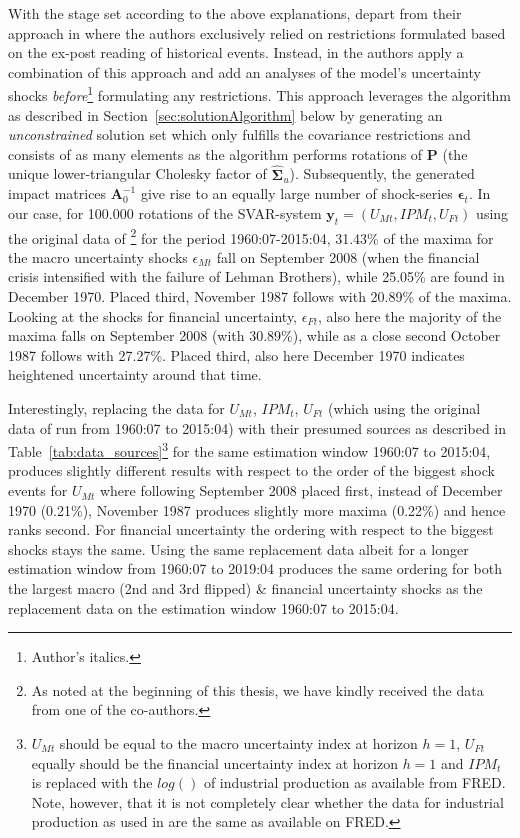 \documentclass[a4paper,11pt,listof=nochaptergap,oneside,pointednumbers,bibtotoc,bigheadings,liststotoc,hidelinks]{scrbook}
\theoremstyle{mysatz}
\theoremstyle{mydefinition}
\theoremstyle{mytheorem}
\theoremstyle{mybemerkung}
\let\oldhat\hat
\newcommand{\vect}[1]{\boldsymbol{\mathbf{#1}}}
\newcommand{\hatt}[1]{\oldhat{\boldsymbol{\mathbf{#1}}}}
\begin{document}
With the stage set according to the above explanations, \citet{ludvigsonetal:19} depart from their approach in \citet{ludvigsonetal:18} where the authors exclusively relied on restrictions formulated based on the ex-post reading of historical events. Instead, in \citet{ludvigsonetal:19} the authors apply a combination of this approach and add an analyses of the model's uncertainty shocks \textit{before}\footnote{Author's italics.} formulating any restrictions. This approach leverages the algorithm as described in Section~\ref{sec:solutionAlgorithm} below by generating an \textit{unconstrained} solution set which only fulfills the covariance restrictions and consists of as many elements as the algorithm performs rotations of $\vect{P}$ (the unique lower-triangular Cholesky factor of $\hatt{\vect{\Sigma}}_u$). Subsequently, the generated impact matrices $\vect{A}_0^{-1}$ give rise to an equally large number of shock-series $\vect{\epsilon}_t$. In our case, for 100.000 rotations of the SVAR-system $\vect{y}_t = (U_{Mt}, IPM_{t}, U_{Ft})$ using the original data of \citet{ludvigsonetal:18,ludvigsonetal:19}\footnote{As noted at the beginning of this thesis, we have kindly received the data from one of the co-authors.} for the period 1960:07-2015:04, 31.43\% of the maxima for the macro uncertainty shocks $\epsilon_{Mt}$ fall on September 2008 (when the financial crisis intensified with the failure of Lehman Brothers), while 25.05\% are found in December 1970. Placed third, November 1987 follows with 20.89\% of the maxima. Looking at the shocks for financial uncertainty, $\epsilon_{Ft}$, also here the majority of the maxima falls on September 2008 (with 30.89\%), while as a close second October 1987 follows with 27.27\%. Placed third, also here December 1970 indicates heightened uncertainty around that time.

Interestingly, replacing the data for $U_{Mt}$, $IPM_{t}$, $U_{Ft}$ (which using the original data of \citet{ludvigsonetal:18, ludvigsonetal:19} run from 1960:07 to 2015:04) with their presumed sources as described in Table~\ref{tab:data_sources}\footnote{$U_{Mt}$ should be equal to the macro uncertainty index at horizon $h=1$, $U_{Ft}$ equally should be the financial uncertainty index at horizon $h=1$ and $IPM_{t}$ is replaced with the $log()$ of industrial production as available from FRED. Note, however, that it is not completely clear whether the data for industrial production as used in \citet{ludvigsonetal:18, ludvigsonetal:19} are the same as available on FRED.} for the same estimation window 1960:07 to 2015:04, produces slightly different results with respect to the order of the biggest shock events for $U_{Mt}$ where following September 2008 placed first, instead of December 1970 (0.21\%), November 1987 produces slightly more maxima (0.22\%) and hence ranks second. For financial uncertainty the ordering with respect to the biggest shocks stays the same. Using the same replacement data albeit for a longer estimation window from 1960:07 to 2019:04 produces the same ordering for both the largest macro (2nd and 3rd flipped) \& financial uncertainty shocks as the replacement data on the estimation window 1960:07 to 2015:04. 
\end{document}
